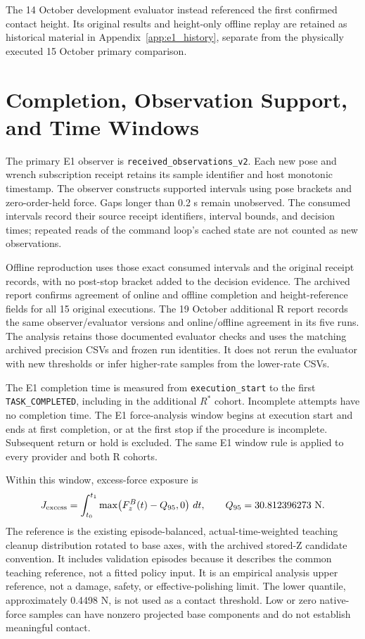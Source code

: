 The 14 October development evaluator instead referenced the first confirmed contact height. Its original results and height-only offline replay are retained as historical material in Appendix~\ref{app:e1_history}, separate from the physically executed 15 October primary comparison.

\section{Completion, Observation Support, and Time Windows}
The primary E1 observer is \texttt{received\_observations\_v2}. Each new pose and wrench subscription receipt retains its sample identifier and host monotonic timestamp. The observer constructs supported intervals using pose brackets and zero-order-held force. Gaps longer than 0.2 s remain unobserved. The consumed intervals record their source receipt identifiers, interval bounds, and decision times; repeated reads of the command loop's cached state are not counted as new observations.

Offline reproduction uses those exact consumed intervals and the original receipt records, with no post-stop bracket added to the decision evidence. The archived report confirms agreement of online and offline completion and height-reference fields for all 15 original executions. The 19 October additional R report records the same observer/evaluator versions and online/offline agreement in its five runs. The analysis retains those documented evaluator checks and uses the matching archived precision CSVs and frozen run identities. It does not rerun the evaluator with new thresholds or infer higher-rate samples from the lower-rate CSVs.

The E1 completion time is measured from \texttt{execution\_start} to the first \texttt{TASK\_COMPLETED}, including in the additional \(R^{*}\) cohort. Incomplete attempts have no completion time. The E1 force-analysis window begins at execution start and ends at first completion, or at the first stop if the procedure is incomplete. Subsequent return or hold is excluded. The same E1 window rule is applied to every provider and both R cohorts.

Within this window, excess-force exposure is
\begin{equation}
 J_{\mathrm{excess}}=\int_{t_0}^{t_1}
 \max\!\left(F_z^B(t)-Q_{95},0\right)\,dt,
 \qquad Q_{95}=30.812396273\ \mathrm{N}.
 \label{eq:excess_force}
\end{equation}
The reference is the existing episode-balanced, actual-time-weighted teaching cleanup distribution rotated to base axes, with the archived stored-Z candidate convention. It includes validation episodes because it describes the common teaching reference, not a fitted policy input. It is an empirical analysis upper reference, not a damage, safety, or effective-polishing limit. The lower quantile, approximately 0.4498 N, is not used as a contact threshold. Low or zero native-force samples can have nonzero projected base components and do not establish meaningful contact.

